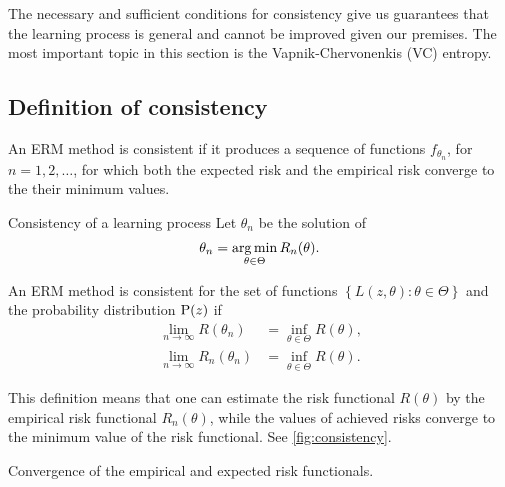 The necessary and sufficient conditions for consistency give us guarantees that the learning
process is general and cannot be improved given our premises.  The most important topic in
this section is the Vapnik-Chervonenkis (VC) entropy.

\subsection{Definition of consistency}

An ERM method is consistent if it produces a sequence of functions $f_{\theta_n}$, for
$n = 1, 2, \dots$, for which both the expected risk and the empirical risk converge to the
their minimum values.

\begin{defbox}{Consistency of a learning process}{}
  Let $\theta_n$ be the solution of
  \begin{equation*}
    \theta_n = \operatorname*{arg\,min}_{\theta \in \Theta} R_n(\theta)\text{.}
  \end{equation*}

  An ERM method is consistent for the set of functions $\left\{ L(z, \theta) : \theta \in
  \Theta \right\}$ and the probability distribution $\operatorname{P}(z)$ if
  \begin{align*}
    \lim_{n \to \infty} R(\theta_n) &= \inf_{\theta \in \Theta} R(\theta)\text{,} \\
    \lim_{n \to \infty} R_n(\theta_n) &= \inf_{\theta \in \Theta} R(\theta)\text{.}
  \end{align*}
\end{defbox}

This definition means that one can estimate the risk functional $R(\theta)$ by the
empirical risk functional $R_n(\theta)$, while the values of achieved risks converge to
the minimum value of the risk functional.  See \cref{fig:consistency}.

\begin{figurebox}[label=fig:consistency]{Convergence of the empirical and expected risk functionals.}
  \centering
\end{figurebox}

